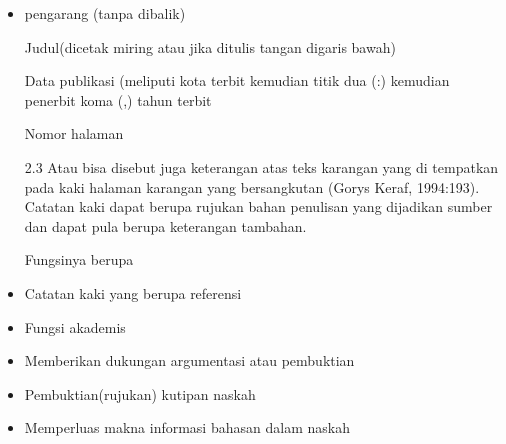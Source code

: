 \begin{itemize}
\vspace{\baselineskip}
	\item pengarang (tanpa dibalik)\par

\vspace{\baselineskip}
Judul(dicetak miring atau jika ditulis tangan digaris bawah)\par

\vspace{\baselineskip}
Data publikasi (meliputi kota terbit kemudian titik dua (:) kemudian penerbit koma (,) tahun terbit\par

\vspace{\baselineskip}
Nomor halaman\par

\vspace{\baselineskip}
2.3 Atau bisa disebut juga keterangan atas teks karangan yang di tempatkan pada kaki halaman karangan yang bersangkutan (Gorys Keraf, 1994:193). Catatan kaki dapat berupa rujukan bahan penulisan yang dijadikan sumber dan dapat pula berupa keterangan tambahan.\par

\vspace{\baselineskip}
Fungsinya berupa\par

\vspace{\baselineskip}
	\item Catatan kaki yang berupa referensi\par

\vspace{\baselineskip}
	\item Fungsi akademis\par

\vspace{\baselineskip}
	\item Memberikan dukungan argumentasi atau pembuktian\par

\vspace{\baselineskip}
	\item Pembuktian(rujukan) kutipan naskah\par

\vspace{\baselineskip}
	\item Memperluas makna informasi bahasan dalam naskah\par


\end{itemize}
